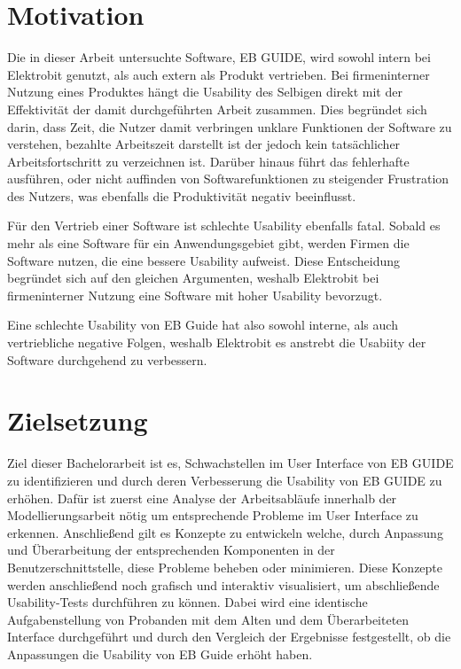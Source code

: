 \section{Motivation}
Die in dieser Arbeit untersuchte Software, EB GUIDE, wird sowohl intern bei Elektrobit genutzt, als auch extern als Produkt vertrieben.
Bei firmeninterner Nutzung eines Produktes hängt die Usability des Selbigen direkt mit der Effektivität der damit durchgeführten Arbeit zusammen.
Dies begründet sich darin, dass Zeit, die Nutzer damit verbringen unklare Funktionen der Software zu verstehen, bezahlte Arbeitszeit darstellt ist der jedoch kein tatsächlicher Arbeitsfortschritt zu verzeichnen ist.
Darüber hinaus führt das fehlerhafte ausführen, oder nicht auffinden von Softwarefunktionen zu steigender Frustration des Nutzers, was ebenfalls die Produktivität negativ beeinflusst.

Für den Vertrieb einer Software ist schlechte Usability ebenfalls fatal.
Sobald es mehr als eine Software für ein Anwendungsgebiet gibt, werden Firmen die Software nutzen, die eine bessere Usability aufweist.
Diese Entscheidung begründet sich auf den gleichen Argumenten, weshalb Elektrobit bei  firmeninterner Nutzung eine Software mit hoher Usability bevorzugt.

Eine schlechte Usability von EB Guide hat also sowohl interne, als auch vertriebliche negative Folgen, weshalb Elektrobit es anstrebt die Usabiity der Software durchgehend zu verbessern.

\section{Zielsetzung}
Ziel dieser Bachelorarbeit ist es, Schwachstellen im User Interface von EB GUIDE zu identifizieren und durch deren Verbesserung die Usability von EB GUIDE zu erhöhen.
Dafür ist zuerst eine Analyse der Arbeitsabläufe innerhalb der Modellierungsarbeit nötig um entsprechende Probleme im User Interface zu erkennen.
Anschließend gilt es Konzepte zu entwickeln welche, durch Anpassung und Überarbeitung der entsprechenden Komponenten in der Benutzerschnittstelle, diese Probleme beheben oder minimieren.
Diese Konzepte werden anschließend noch grafisch und interaktiv visualisiert, um abschließende Usability-Tests durchführen zu können.
Dabei wird eine identische Aufgabenstellung von Probanden mit dem Alten und dem Überarbeiteten Interface durchgeführt und durch den Vergleich der Ergebnisse festgestellt, ob die Anpassungen die Usability von EB Guide erhöht haben.

